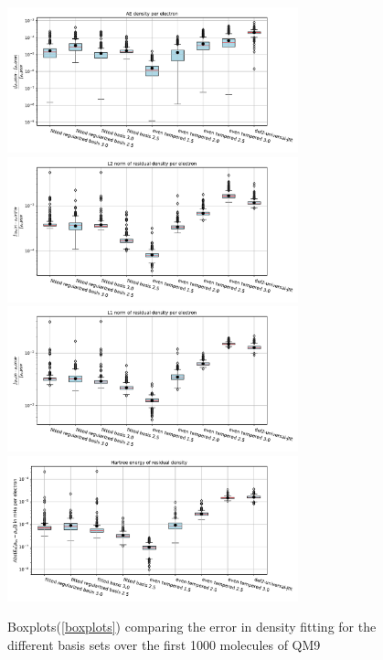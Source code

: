\begin{figure}
    \centering
        \includegraphics[width=0.75\textwidth]{chapters/results/results_images/AE_density_on_hartree+external_MOFDFT_for_different_basis_sets}
    \includegraphics[width=0.75\textwidth]{chapters/results/results_images/L2_residual_densities_on_hartree+external_MOFDFT_for_different_basis_sets}
    \includegraphics[width=0.75\textwidth]{chapters/results/results_images/L1_residual_densities_on_hartree+external_MOFDFT_for_different_basis_sets}
    \includegraphics[width=0.75\textwidth]{chapters/results/results_images/L2_residual_hartree_on_hartree+external_MOFDFT_for_different_basis_sets}
\caption{Boxplots(\ref{boxplots}) comparing the error in density fitting for the different basis sets over the first 1000 molecules of QM9} \label{fig:density_error_basis_sets}
\end{figure}
